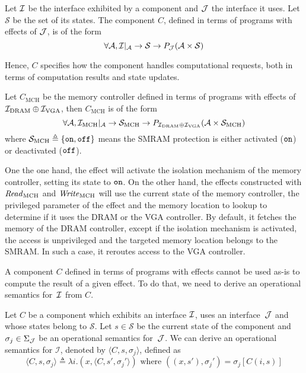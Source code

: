 \begin{definition}[Component] \label{def:freespec:component-model} Let $\mathcal{I}$ be
  the interface exhibited by a component and $\mathcal{J}$ the interface it uses.
  Let $\mathcal{S}$ be the set of its states.
  The component $C$, defined in terms of programs with effects of $\mathcal{J}$, is of
  the form
  \[ \forall \mathcal{A}, \mathcal{I}|_{\mathcal{A}} \rightarrow \mathcal{S}
    \rightarrow P_{\mathcal{J}}(\mathcal{A} \times \mathcal{S}) \]
\end{definition}

Hence, $C$ specifies how the component handles computational requests, both in
terms of computation results and state updates.

\begin{example}
  \label{ex:mch-specs}

  Let $C_{\mathrm{MCH}}$ be the memory controller defined in terms of programs
  with effects of $\mathcal{I}_{\mathrm{DRAM}} \oplus \mathcal{I}_{\mathrm{VGA}}$, then
  $C_{\mathrm{MCH}}$ is of the form
  \[
    \forall \mathcal{A}, \mathcal{I}_{\mathrm{MCH}}|_{\mathcal{A}} \rightarrow
    \mathcal{S}_{\mathrm{MCH}} \rightarrow P_{\mathcal{I}_{\mathrm{DRAM}} \oplus
      \mathcal{I}_{\mathrm{VGA}}}(\mathcal{A} \times \mathcal{S}_{\mathrm{MCH}})
  \] where $\mathcal{S}_{\mathrm{MCH}} \triangleq \{ \mathtt{on}, \mathtt{off} \}$
  means the SMRAM protection is either activated ($\mathtt{on}$) or deactivated
  ($\mathtt{off}$).

  One the one hand, the  effect will activate the isolation mechanism
  of the memory controller, setting its state to $\mathtt{on}$.
  On the other hand, the effects constructed with $\mathit{Read}_{\mathrm{MCH}}$
  and $\mathit{Write}_{\mathrm{MCH}}$ will use the current state of the memory
  controller, the privileged parameter of the effect and the memory location to
  lookup to determine if it uses the DRAM or the VGA controller.
  By default, it fetches the memory of the DRAM controller, except if the
  isolation mechanism is activated, the access is unprivileged and the targeted
  memory location belongs to the SMRAM.
  In such a case, it reroutes access to the VGA controller.
\end{example}

A component $C$ defined in terms of programs with effects cannot be used as-is
to compute the result of a given effect.
%
To do that, we need to derive an operational semantics for~$\mathcal{I}$ from $C$.

\begin{definition} \label{def:freespec:derivation} Let $C$ be a component which
  exhibits an interface $\mathcal{I}$, uses an interface~$\mathcal{J}$ and whose states belong to
  $\mathcal{S}$.
  Let $s \in \mathcal{S}$ be the current state of the component and
  $\sigma_j \in \Sigma_{\mathcal{J}}$ be an operational semantics for~$\mathcal{J}$.
  We can derive an operational semantics for $\mathcal{I}$, denoted by
  $\langle C, s, \sigma_j \rangle$, defined as
  \[ \langle C, s, \sigma_j \rangle \triangleq \lambda i. (x, \langle C, s',
    \sigma_j' \rangle) \text{ where } ((x, s'), \sigma_j') = \sigma_j[C (i, s)]
  \]
\end{definition}

